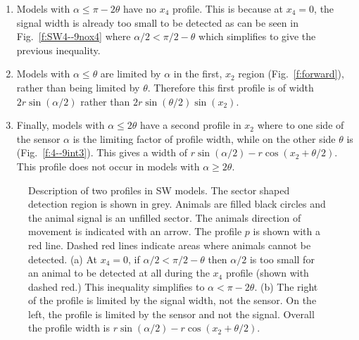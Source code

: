 \begin{enumerate}
\item Models with $\alpha \le \pi - 2\theta$  have no $x_4$ profile. This is because at $x_4 = 0$, the signal width is already too small to be detected as can be seen in Fig.~\ref{f:SW4--9nox4} where $\alpha/2 < \pi/2 - \theta$ which simplifies to give the previous inequality.

\item Models with $\alpha \le \theta$ are limited by $\alpha$ in the first, $x_2$ region (Fig.~\ref{f:forward}), rather than being limited by $\theta$. Therefore this first profile is of width $2r\sin(\alpha/2)$ rather than $2r\sin(\theta/2)\sin(x_2)$.

\item Finally, models with $\alpha \le 2\theta$ have a second profile in $x_2$ where to one side of the sensor $\alpha$ is the limiting factor of profile width, while on the other side $\theta$ is (Fig.~\ref{f:4--9int3}). This gives a width of $r\sin(\alpha/2) - r\cos(x_2 + \theta/2)$. This profile does not occur in models with $\alpha \ge 2\theta$.

\end{enumerate}

\begin{figure}[t]
 \centering
{
}
\caption[Description of two profiles in SW models]{
Description of two profiles in SW models. 
The sector shaped detection region is shown in grey. 
Animals are filled black circles and the animal signal is an unfilled sector. 
The animals direction of movement is indicated with an arrow. 
The profile $p$ is shown with a red line. 
Dashed red lines indicate areas where animals cannot be detected. 
(a) At $x_4 = 0$, if $\alpha/2 < \pi/2 - \theta$ then $\alpha/2$ is too small for an animal to be detected at all during the $x_4$ profile (shown with dashed red.)
This inequality simplifies to $\alpha < \pi - 2\theta$. 
(b) The right of the profile is limited by the signal width, not the sensor. 
On the left, the profile is limited by the sensor and not the signal. 
Overall the profile width is $r\sin(\alpha/2) - r\cos(x_2 + \theta/2)$.    
}
\label{f:SW4--9}
\end{figure}

